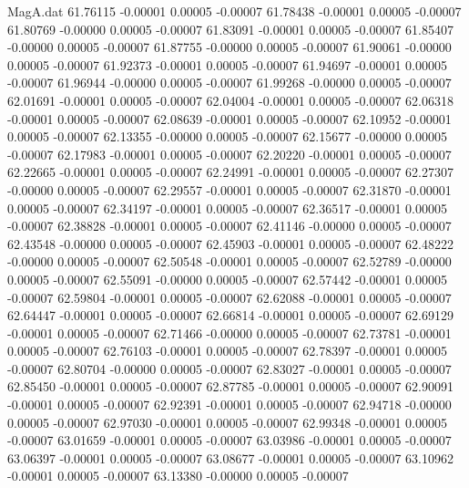 \begin{filecontents}{MagA.dat}
  61.76115   -0.00001    0.00005   -0.00007
  61.78438   -0.00001    0.00005   -0.00007
  61.80769   -0.00000    0.00005   -0.00007
  61.83091   -0.00001    0.00005   -0.00007
  61.85407   -0.00000    0.00005   -0.00007
  61.87755   -0.00000    0.00005   -0.00007
  61.90061   -0.00000    0.00005   -0.00007
  61.92373   -0.00001    0.00005   -0.00007
  61.94697   -0.00001    0.00005   -0.00007
  61.96944   -0.00000    0.00005   -0.00007
  61.99268   -0.00000    0.00005   -0.00007
  62.01691   -0.00001    0.00005   -0.00007
  62.04004   -0.00001    0.00005   -0.00007
  62.06318   -0.00001    0.00005   -0.00007
  62.08639   -0.00001    0.00005   -0.00007
  62.10952   -0.00001    0.00005   -0.00007
  62.13355   -0.00000    0.00005   -0.00007
  62.15677   -0.00000    0.00005   -0.00007
  62.17983   -0.00001    0.00005   -0.00007
  62.20220   -0.00001    0.00005   -0.00007
  62.22665   -0.00001    0.00005   -0.00007
  62.24991   -0.00001    0.00005   -0.00007
  62.27307   -0.00000    0.00005   -0.00007
  62.29557   -0.00001    0.00005   -0.00007
  62.31870   -0.00001    0.00005   -0.00007
  62.34197   -0.00001    0.00005   -0.00007
  62.36517   -0.00001    0.00005   -0.00007
  62.38828   -0.00001    0.00005   -0.00007
  62.41146   -0.00000    0.00005   -0.00007
  62.43548   -0.00000    0.00005   -0.00007
  62.45903   -0.00001    0.00005   -0.00007
  62.48222   -0.00000    0.00005   -0.00007
  62.50548   -0.00001    0.00005   -0.00007
  62.52789   -0.00000    0.00005   -0.00007
  62.55091   -0.00000    0.00005   -0.00007
  62.57442   -0.00001    0.00005   -0.00007
  62.59804   -0.00001    0.00005   -0.00007
  62.62088   -0.00001    0.00005   -0.00007
  62.64447   -0.00001    0.00005   -0.00007
  62.66814   -0.00001    0.00005   -0.00007
  62.69129   -0.00001    0.00005   -0.00007
  62.71466   -0.00000    0.00005   -0.00007
  62.73781   -0.00001    0.00005   -0.00007
  62.76103   -0.00001    0.00005   -0.00007
  62.78397   -0.00001    0.00005   -0.00007
  62.80704   -0.00000    0.00005   -0.00007
  62.83027   -0.00001    0.00005   -0.00007
  62.85450   -0.00001    0.00005   -0.00007
  62.87785   -0.00001    0.00005   -0.00007
  62.90091   -0.00001    0.00005   -0.00007
  62.92391   -0.00001    0.00005   -0.00007
  62.94718   -0.00000    0.00005   -0.00007
  62.97030   -0.00001    0.00005   -0.00007
  62.99348   -0.00001    0.00005   -0.00007
  63.01659   -0.00001    0.00005   -0.00007
  63.03986   -0.00001    0.00005   -0.00007
  63.06397   -0.00001    0.00005   -0.00007
  63.08677   -0.00001    0.00005   -0.00007
  63.10962   -0.00001    0.00005   -0.00007
  63.13380   -0.00000    0.00005   -0.00007

\end{filecontents}
